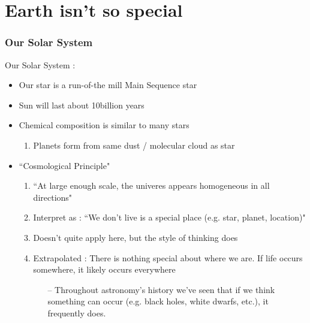 \documentclass{beamer}
\begin{document}
\section{Earth isn't so special}
\begin{frame}
\frametitle{Our Solar System}
Our Solar System : 
\begin{itemize}
    \item Our star is a run-of-the mill Main Sequence star
    \pause
    \item Sun will last about 10billion years
    \pause
    \item Chemical composition is similar to many stars 
    \pause
    \begin{enumerate}
        \item Planets form from same dust / molecular cloud as star
    \end{enumerate}
    \item ``Cosmological Principle"
    \begin{enumerate}
        \item ``At large enough scale, the univeres appears homogeneous in all directions"
        \pause 
        \item Interpret as : ``We don't live is a special place (e.g. star, planet, location)" 
        \pause
        \item Doesn't quite apply here, but the style of thinking does
        \pause
        \item Extrapolated : There is nothing special about where we are. If life occurs somewhere, it likely occurs everywhere
        \pause
        \begin{itemize}
            \item[--] Throughout astronomy's history we've seen that if we think something can occur (e.g. black holes, white dwarfs, etc.), it frequently does.
        \end{itemize}
    \end{enumerate}
\end{itemize}
\end{frame}

\end{document}
